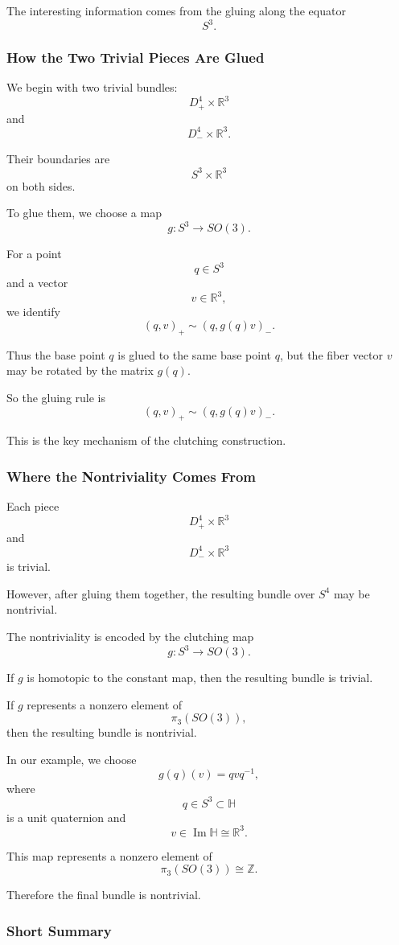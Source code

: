 \documentclass[12pt,a4paper]{article}
\theoremstyle{notespace}
\begin{document}
The interesting information comes from the gluing along the equator
\[
S^3.
\]

\subsubsection{How the Two Trivial Pieces Are Glued}

We begin with two trivial bundles:
\[
D^4_+\times \mathbb R^3
\]
and
\[
D^4_-\times \mathbb R^3.
\]

Their boundaries are
\[
S^3\times \mathbb R^3
\]
on both sides.

To glue them, we choose a map
\[
g:S^3\longrightarrow SO(3).
\]

For a point
\[
q\in S^3
\]
and a vector
\[
v\in \mathbb R^3,
\]
we identify
\[
(q,v)_+
\sim
(q,g(q)v)_-.
\]

Thus the base point \(q\) is glued to the same base point \(q\), but the fiber vector \(v\) may be rotated by the matrix \(g(q)\).

So the gluing rule is
\[
\boxed{
	(q,v)_+
	\sim
	(q,g(q)v)_-.
}
\]

This is the key mechanism of the clutching construction.

\subsubsection{Where the Nontriviality Comes From}

Each piece
\[
D^4_+\times \mathbb R^3
\]
and
\[
D^4_-\times \mathbb R^3
\]
is trivial.

However, after gluing them together, the resulting bundle over \(S^4\) may be nontrivial.

The nontriviality is encoded by the clutching map
\[
g:S^3\to SO(3).
\]

If \(g\) is homotopic to the constant map, then the resulting bundle is trivial.

If \(g\) represents a nonzero element of
\[
\pi_3(SO(3)),
\]
then the resulting bundle is nontrivial.

In our example, we choose
\[
g(q)(v)=qvq^{-1},
\]
where
\[
q\in S^3\subset \mathbb H
\]
is a unit quaternion and
\[
v\in \operatorname{Im}\mathbb H\cong \mathbb R^3.
\]

This map represents a nonzero element of
\[
\pi_3(SO(3))\cong \mathbb Z.
\]

Therefore the final bundle is nontrivial.

\subsubsection{Short Summary}
\end{document}
